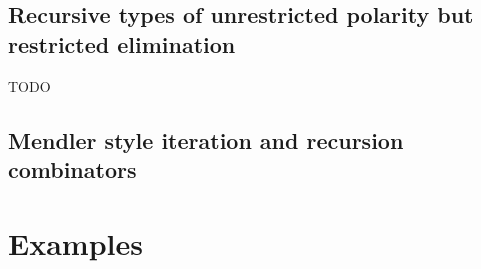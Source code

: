 \subsection{Recursive types of unrestricted polarity but restricted elimination}
\label{sec:bg:recty}
TODO

\subsection{Mendler style iteration and recursion combinators}
\label{sec:bg:Mendler}


\section{Examples}\label{sec:examples}

